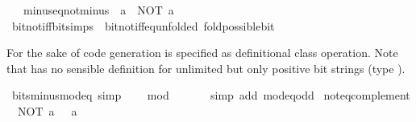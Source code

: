\begin{isabellebody}
\ \ \ minus{\isacharunderscore}{\kern0pt}eq{\isacharunderscore}{\kern0pt}not{\isacharunderscore}{\kern0pt}minus{\isacharunderscore}{\kern0pt}{}{\isacharcolon}{\kern0pt}\ {\isacartoucheopen}{\isacharminus}{\kern0pt}\ a\ {\isacharequal}{\kern0pt}\ NOT\ {\isacharparenleft}{\kern0pt}a\ {\isacharminus}{\kern0pt}\ {}{\isacharparenright}{\kern0pt}{\isacartoucheclose}\isanewline
{}\isanewline
\isanewline
{}\isamarkupfalse%
\ bit{\isacharunderscore}{\kern0pt}not{\isacharunderscore}{\kern0pt}iff{\isacharbrackleft}{\kern0pt}bit{\isacharunderscore}{\kern0pt}simps{\isacharbrackright}{\kern0pt}\ {\isacharequal}{\kern0pt}\ bit{\isacharunderscore}{\kern0pt}not{\isacharunderscore}{\kern0pt}iff{\isacharunderscore}{\kern0pt}eq{\isacharbrackleft}{\kern0pt}unfolded\ fold{\isacharunderscore}{\kern0pt}possible{\isacharunderscore}{\kern0pt}bit{\isacharbrackright}{\kern0pt}%
\begin{isamarkuptext}%
For the sake of code generation  is specified as
  definitional class operation.  Note that  has no
  sensible definition for unlimited but only positive bit strings
  (type ).%
\end{isamarkuptext}\isamarkuptrue%
\isamarkupfalse%
\ bits{\isacharunderscore}{\kern0pt}minus{\isacharunderscore}{\kern0pt}{}{\isacharunderscore}{\kern0pt}mod{\isacharunderscore}{\kern0pt}{}{\isacharunderscore}{\kern0pt}eq\ {\isacharbrackleft}{\kern0pt}simp{\isacharbrackright}{\kern0pt}{\isacharcolon}{\kern0pt}\isanewline
\ \ {\isacartoucheopen}{\isacharparenleft}{\kern0pt}{\isacharminus}{\kern0pt}\ {}{\isacharparenright}{\kern0pt}\ mod\ {}\ {\isacharequal}{\kern0pt}\ {}{\isacartoucheclose}\isanewline
%
\isadelimproof
\ \ %
\endisadelimproof
%
\isatagproof
{}\isamarkupfalse%
\ {\isacharparenleft}{\kern0pt}simp\ add{\isacharcolon}{\kern0pt}\ mod{\isacharunderscore}{\kern0pt}{}{\isacharunderscore}{\kern0pt}eq{\isacharunderscore}{\kern0pt}odd{\isacharparenright}{\kern0pt}%
\endisatagproof
{\isafoldproof}%
%
\isadelimproof
\isanewline
%
\endisadelimproof
\isanewline
{}\isamarkupfalse%
\ not{\isacharunderscore}{\kern0pt}eq{\isacharunderscore}{\kern0pt}complement{\isacharcolon}{\kern0pt}\isanewline
\ \ {\isacartoucheopen}NOT\ a\ {\isacharequal}{\kern0pt}\ {\isacharminus}{\kern0pt}\ a\ {\isacharminus}{\kern0pt}\ {}{\isacartoucheclose}\isanewline
%
\isadelimproof
\ \ %
\endisadelimproof
%
\isatagproof
{}\isamarkupfalse%

\end{isabellebody}
